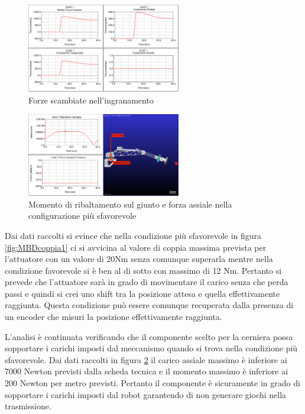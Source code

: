 \documentclass[%
corpo=11pt,
twoside,
 stile=classica,
oldstyle,
greek,%
]{toptesi}
\begin{document}
	\begin{figure} [!ht]
		\centering
		\includegraphics[width=0.6\textwidth]{Plots/BASE/joint1_forze.png}
		\caption{Forze scambiate nell'ingranamento}
		\label{fig:MBDforze1}
	\end{figure}
	\begin{figure}[!ht]
		\centering
		\includegraphics[width=0.6\textwidth]{Plots/BASE/joint1_ralla.png}
		\caption{Momento di ribaltamento sul giunto e forza assiale nella configurazione più sfavorevole}
		\label{fig:MBDralla1}
	\end{figure}
	
			Dai dati raccolti si evince che nella condizione più sfavorevole in figura \ref{fig:MBDcoppia1}  ci si avvicina al valore di coppia massima prevista per l'attuatore con un valore di 20Nm senza comunque superarla mentre nella condizione favorevole si è ben al di sotto con massimo di 12 Nm. 
			Pertanto si prevede che l'attuatore sarà in grado di movimentare il carico senza che perda passi e quindi si crei uno shift tra la posizione attesa e quella effettivamente raggiunta. Questa condizione può essere comunque recuperata dalla presenza di un encoder che misuri la posizione effettivamente raggiunta. 
			
			L'analisi è continuata verificando che il componente scelto per la cerniera possa sopportare i carichi imposti dal meccanismo quando si trova nella condizione più sfavorevole.
			Dai dati raccolti in figura \ref{fig:MBDralla1} il carico assiale massimo è inferiore ai 7000 Newton previsti dalla scheda tecnica e il momento massimo è inferiore ai 200 Newton per metro previsti. Pertanto il componente è sicuramente in grado di sopportare i carichi imposti dal robot garantendo di non generare giochi nella trasmissione. 
			
\end{document}
